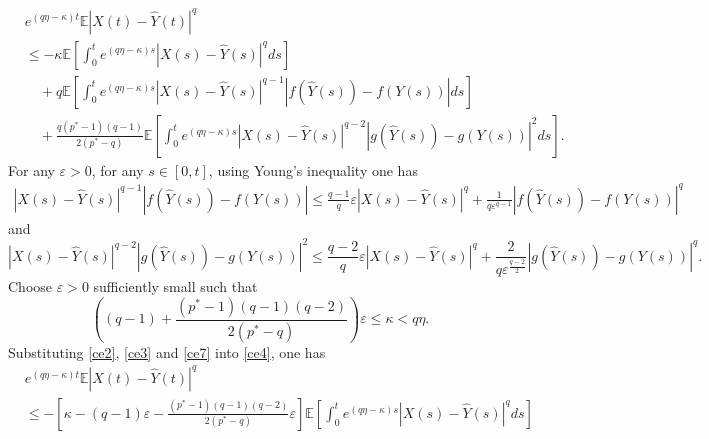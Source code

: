 \documentclass[10pt,a4paper]{amsart}
\renewenvironment{proof}{\noindent {\it  Proof.} \rm}{\pend}
\begin{document}
\begin{proof}
\begin{equation}
\begin{split}
	&{e^{\left( {q\eta  - \kappa } \right)t}}\mathbb{E}{\left| {X(t) - \hat Y(t)} \right|^q} \\
	&\le  - \kappa \mathbb{E}\left[ {\int_0^t {{e^{\left( {q\eta  - \kappa } \right)s}}{{\left| {X(s) - \hat Y(s)} \right|}^q}ds} } \right] \\
	&\quad+ q\mathbb{E}\left[ {\int_0^t {{e^{\left( {q\eta  - \kappa } \right)s}}{{\left| {X(s) - \hat Y(s)} \right|}^{q - 1}}\left| {f(\hat Y(s)) - f(Y(s))} \right|ds} } \right] \\
	&\quad+ \frac{{q({p^*} - 1)(q - 1)}}{{2({p^*} - q)}}\mathbb{E}\left[ {\int_0^t {{e^{\left( {q\eta  - \kappa } \right)s}}{{\left| {X(s) -\hat  Y(s)} \right|}^{q - 2}}{{\left| {g(\hat Y(s)) - g(Y(s))} \right|}^2}ds} } \right] .
\end{split}
\end{equation}
For any $\varepsilon > 0$, for any $s \in [0, t]$, using Young's inequality one has
\begin{equation}   \label{ce2}
\begin{split}
	{\left| {X(s) - \hat Y(s)} \right|^{q - 1}}\left| {f(\hat Y(s)) - f(Y(s))} \right| \le \frac{{q - 1}}{q}\varepsilon {\left| {X(s) - \hat Y(s)} \right|^q} + \frac{1}{{q{\varepsilon ^{q - 1}}}}{\left| {f(\hat Y(s)) - f(Y(s))} \right|^q}
\end{split}
\end{equation}
and 
\begin{equation} \label{ce3}
	{\left| {X(s) - \hat Y(s)} \right|^{q - 2}}{\left| {g(\hat Y(s)) - g(Y(s))} \right|^2} \le \frac{{q - 2}}{q}\varepsilon {\left| {X(s) - \hat Y(s)} \right|^q} + \frac{2}{{q{\varepsilon ^{\frac{{q - 2}}{2}}}}}{\left| {g(\hat Y(s)) - g(Y(s))} \right|^q} .
\end{equation}
Choose $\varepsilon > 0$ sufficiently small such that
\begin{equation}  \label{ce7}
	\left( {(q - 1) + \frac{{({p^*} - 1)(q - 1)(q - 2)}}{{2({p^*} - q)}}} \right)\varepsilon  \le \kappa  < q\eta .
\end{equation}
Substituting \eqref{ce2}, \eqref{ce3} and \eqref{ce7} into \eqref{ce4}, one has
\begin{equation}  \label{ce1}
\begin{split}
	&{e^{\left( {q\eta  - \kappa } \right)t}}\mathbb{E}{\left| {X(t) -  \hat Y(t)} \right|^q} \\
	&\le  - \left[ {\kappa  - (q - 1)\varepsilon  - \frac{{({p^*} - 1)(q - 1)(q - 2)}}{{2({p^*} - q)}}\varepsilon } \right]\mathbb{E}\left[ {\int_0^t {{e^{\left( {q\eta  - \kappa } \right)s}}{{\left| {X(s) - \hat Y(s)} \right|}^q}ds} } \right]  \\

\end{split}
\end{equation}
\end{proof}
\end{document}
